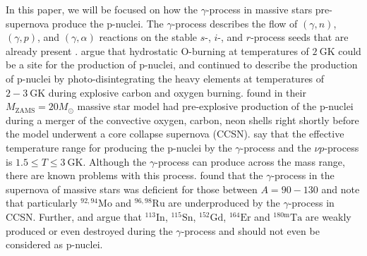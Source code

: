In this paper, we will be focused on how the $\gamma$-process in massive stars pre-supernova produce the p-nuclei.
The $\gamma$-process describes the flow of $(\gamma,n)$, $(\gamma,p)$, and $(\gamma,\alpha)$ reactions on the stable $s$-, $i$-, and $r$-process seeds that are already present \cite{rauscherConstrainingAstrophysicalOrigin2013}.
\cite{arnouldPossibilitySynthesisProtonrich1976} argue that hydrostatic O-burning at temperatures of $2 \mathrm{~GK}$ could be a site for the production of p-nuclei, and \cite{woosleyPprocessesSupernovae1978} continued to describe the production of p-nuclei by photo-disintegrating the heavy elements at temperatures of $2-3\mathrm{~GK}$ during explosive carbon and oxygen burning. 
\cite{rauscherNucleosynthesisMassiveStars2002} found in their $M_{\mathrm{ZAMS}}=20 M_\odot$ massive star model had pre-explosive production of the p-nuclei during a merger of the convective oxygen, carbon, neon shells right shortly before the model underwent a core collapse supernova (CCSN).
\cite{rauscherConstrainingAstrophysicalOrigin2013} say that the effective temperature range for producing the p-nuclei by the $\gamma$-process and the $\nu p$-process is $1.5\leq T \leq 3 \mathrm{~GK}$.
Although the $\gamma$-process can produce across the mass range, there are known problems with this process.
\cite{woosleyNucleosynthesisRemnantsMassive2007} found that the $\gamma$-process in the supernova of massive stars was deficient for those between $A=90-130$ and 
\cite{arnouldPprocessStellarNucleosynthesis2003} note that particularly $^{92,94}\mathrm{Mo}$ and $^{96,98}\mathrm{Ru}$ are underproduced by the $\gamma$-process in CCSN. 
Further, \cite{rayetPprocessRevisited1990} and \cite{dillmannPProcessSimulationsModified2008} argue that $^{113}\mathrm{In}$, $^{115}\mathrm{Sn}$, $^{152}\mathrm{Gd}$, $^{164}\mathrm{Er}$ and $^{180\mathrm{m}}\mathrm{Ta}$ are weakly produced or even destroyed during the $\gamma$-process and should not even be considered as p-nuclei.

